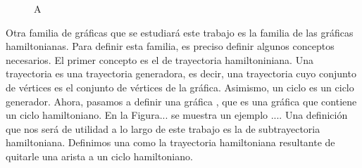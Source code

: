 \begin{figure}[ht!]
    \centering
        \caption{A}
        \label{fig:ex-bip}
    \end{figure}
    
Otra  familia de gr\'aficas que se estudiar\'a este trabajo es la familia de las
gr\'aficas hamiltonianas. Para definir esta familia, es preciso definir algunos
conceptos necesarios. El primer concepto es el de trayectoria hamiltoniniana.
Una trayectoria  es una trayectoria
generadora, es decir, una trayectoria cuyo conjunto de v\'ertices es el conjunto
de v\'ertices de la gr\'afica. Asimismo, un ciclo
 es un ciclo generador. Ahora, pasamos a definir
una gr\'afica , que es una gr\'afica que
contiene un ciclo hamiltoniano. En la Figura... se muestra un ejemplo .... Una
definici\'on que nos ser\'a de utilidad a lo largo de este trabajo es la de
subtrayectoria hamiltoniana. Definimos una 
como la trayectoria hamiltoniana resultante de quitarle una arista a un ciclo
hamiltoniano. 

